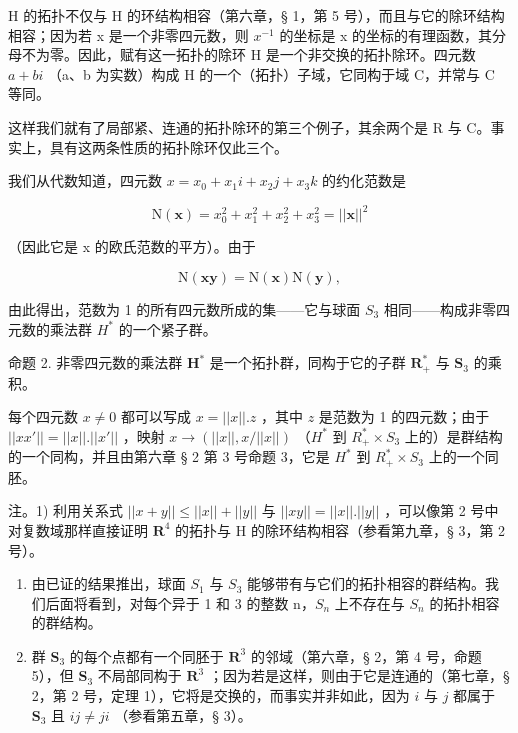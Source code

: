 H 的拓扑不仅与 H 的环结构相容（第六章，§ 1，第 5 号），而且与它的除环结构相容；因为若 x 是一个非零四元数，则 \(x^{-1}\) 的坐标是 x 的坐标的有理函数，其分母不为零。因此，赋有这一拓扑的除环 H 是一个非交换的拓扑除环。四元数 \(a + bi\) （a、b 为实数）构成 H 的一个（拓扑）子域，它同构于域 C，并常与 C 等同。

这样我们就有了局部紧、连通的拓扑除环的第三个例子，其余两个是 R 与 C。事实上，具有这两条性质的拓扑除环仅此三个。

我们从代数知道，四元数 \(x = x_{0} + x_{1}i + x_{2}j + x_{3}k\) 的约化范数是

\[
\mathrm{N} (\boldsymbol {x}) = x _ {0} ^ {2} + x _ {1} ^ {2} + x _ {2} ^ {2} + x _ {3} ^ {2} = | | \boldsymbol {x} | | ^ {2}
\]

（因此它是 x 的欧氏范数的平方）。由于

\[
\mathrm{N} (\boldsymbol {x y}) = \mathrm{N} (\boldsymbol {x}) \mathrm{N} (\boldsymbol {y}),
\]

由此得出，范数为 1 的所有四元数所成的集——它与球面 \(S_{3}\) 相同——构成非零四元数的乘法群 \(H^{*}\) 的一个紧子群。

命题 2. 非零四元数的乘法群 \(\mathbf{H}^*\) 是一个拓扑群，同构于它的子群 \(\mathbf{R}_+^*\) 与 \(\mathbf{S}_3\) 的乘积。

每个四元数 \(x \neq 0\) 都可以写成 \(x = ||x||.z\) ，其中 \(z\) 是范数为 1 的四元数；由于 \(||xx'|| = ||x||.||x'||\) ，映射 \(x \to (||x||, x/||x||)\) （\(H^*\) 到 \(R_+^* \times S_3\) 上的）是群结构的一个同构，并且由第六章 § 2 第 3 号命题 3，它是 \(H^*\) 到 \(R_+^* \times S_3\) 上的一个同胚。

注。1) 利用关系式 \(||x + y|| \leqslant ||x|| + ||y||\) 与 \(||xy|| = ||x||.||y||\) ，可以像第 2 号中对复数域那样直接证明 \(\mathbf{R}^4\) 的拓扑与 H 的除环结构相容（参看第九章，§ 3，第 2 号）。

\begin{enumerate}
\def\labelenumi{\arabic{enumi})}
\setcounter{enumi}{1}
\item
  由已证的结果推出，球面 \(S_{1}\) 与 \(S_{3}\) 能够带有与它们的拓扑相容的群结构。我们后面将看到，对每个异于 1 和 3 的整数 n，\(S_{n}\) 上不存在与 \(S_{n}\) 的拓扑相容的群结构。
\item
  群 \(\mathbf{S}_3\) 的每个点都有一个同胚于 \(\mathbf{R}^3\) 的邻域（第六章，§ 2，第 4 号，命题 5），但 \(\mathbf{S}_3\) 不局部同构于 \(\mathbf{R}^3\) ；因为若是这样，则由于它是连通的（第七章，§ 2，第 2 号，定理 1），它将是交换的，而事实并非如此，因为 \(i\) 与 \(j\) 都属于 \(\mathbf{S}_3\) 且 \(ij \neq ji\) （参看第五章，§ 3）。
\end{enumerate}

